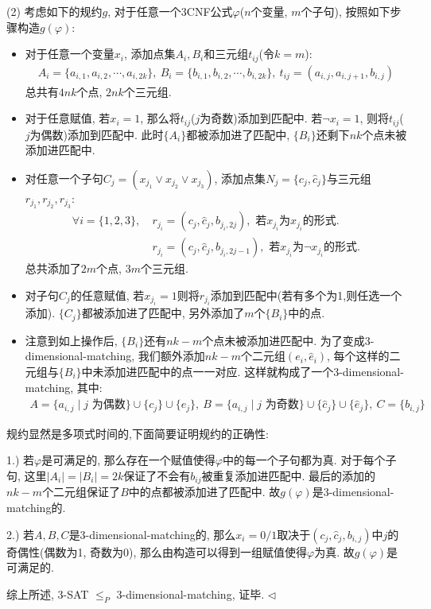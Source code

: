 \documentclass[11pt]{article}
\newenvironment{answer}[1][Answer]{\begin{trivlist}
\item[\hskip \labelsep{\bfseries\itshape#1.}\hskip \labelsep]}{\hfill$\lhd$\end{trivlist}}
\begin{document}
\begin{answer}
    (2) 考虑如下的规约$g$, 对于任意一个3CNF公式$\varphi$($n$个变量, $m$个子句), 按照如下步骤构造$g(\varphi)$: 
    \begin{itemize}
        \item 对于任意一个变量$x_i$, 添加点集$A_i, B_i$和三元组$t_{ij}$(令$k = m$):
        \begin{align*}
            A_i = \{a_{i,1}, a_{i,2}, \cdots, a_{i,2k}\},~ B_i = \{b_{i,1}, b_{i,2}, \cdots, b_{i,2k}\},~ t_{ij} = (a_{i,j}, a_{i, j+1}, b_{i,j})
        \end{align*}
        总共有$4nk$个点, $2nk$个三元组. 
        \item 对于任意赋值, 若$x_i = 1$, 那么将$t_{ij}$($j$为奇数)添加到匹配中. 若$\neg x_i = 1$, 则将$t_{ij}$($j$为偶数)添加到匹配中. 此时$\{A_i\}$都被添加进了匹配中, $\{B_i\}$还剩下$nk$个点未被添加进匹配中.
        \item 对任意一个子句$C_j = (x_{j_1}\lor x_{j_2}\lor x_{j_3})$, 添加点集$N_j= \{c_{j}, \hat{c}_j\}$与三元组$r_{j_1}, r_{j_2}, r_{j_3}$:
        \begin{align*}
            \forall i = \{1,2,3\},~ &r_{j_i} = (c_j, \hat{c}_j, b_{j_i,2j}), \text{ 若$x_{j_i}$为$x_{j_i}$的形式}. \\
            &r_{j_i} = (c_j, \hat{c}_j, b_{j_i,2j-1}), \text{ 若$x_{j_i}$为$\neg x_{j_i}$的形式}.
        \end{align*}
        总共添加了$2m$个点, $3m$个三元组.
        \item 对子句$C_j$的任意赋值, 若$x_{j_i} = 1$则将$r_{j_i}$添加到匹配中(若有多个为1,则任选一个添加). $\{C_j\}$都被添加进了匹配中, 另外添加了$m$个$\{B_i\}$中的点.
        \item 注意到如上操作后, $\{B_i\}$还有$nk - m$个点未被添加进匹配中. 为了变成3-dimensional-matching, 我们额外添加$nk-m$个二元组$(e_i, \hat{e}_i)$, 每个这样的二元组与$\{B_i\}$中未添加进匹配中的点一一对应. 这样就构成了一个3-dimensional-matching, 其中:
        \begin{align*}
            A = \{a_{i,j}\mid j \text{ 为偶数}\}\cup\{c_j\} \cup\{e_j\},~ B = \{a_{i,j}\mid j \text{ 为奇数}\}\cup\{\hat{c}_j\} \cup\{\hat{e}_j\},~ C = \{b_{i,j}\}
        \end{align*}
    \end{itemize}
    规约显然是多项式时间的,下面简要证明规约的正确性:
    
    1.) 若$\varphi$是可满足的, 那么存在一个赋值使得$\varphi$中的每一个子句都为真. 对于每个子句,  这里$|A_i| = |B_i| = 2k$保证了不会有$b_{ij}$被重复添加进匹配中. 最后的添加的$nk-m$个二元组保证了$B$中的点都被添加进了匹配中. 故$g(\varphi)$是3-dimensional-matching的.

    2.) 若$A,B,C$是3-dimensional-matching的, 那么$x_i = 0/1$取决于$(c_j, \hat{c}_j, b_{i,j})$中$j$的奇偶性(偶数为1, 奇数为0), 那么由构造可以得到一组赋值使得$\varphi$为真. 故$g(\varphi)$是可满足的.

    综上所述, 3-SAT $\leq_{P}$ 3-dimensional-matching, 证毕. 
\end{answer}
\end{document}
